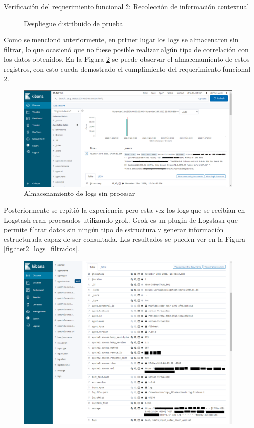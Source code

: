 \begin{section}{Verificación del requerimiento funcional 2: Recolección de información contextual}
\begin{figure}[H]
        \caption{Despliegue distribuido de prueba}
        \label{fig:iter2_despl_dist}
    \end{figure}
    \FloatBarrier
    Como se mencionó anteriormente, en primer lugar los logs se almacenaron sin filtrar, lo que ocasionó que no fuese posible realizar algún tipo de correlación con los datos obtenidos. En la Figura \ref{fig:iter2_logs_crudos} se puede observar el almacenamiento de estos registros, con esto queda demostrado el cumplimiento del requerimiento funcional 2.
    \begin{figure}[H]
    \centering
        \includegraphics[width=1\textwidth]{./iteracion_2_imagenes/1_kibana_logs_1EDITADA.png}
        \caption{Almacenamiento de logs sin procesar}
        \label{fig:iter2_logs_crudos}
    \end{figure}
    \FloatBarrier
    Posteriormente se repitió la experiencia pero esta vez los logs que se recibían en Logstash eran procesados utilizando grok. Grok es un plugin de Logstash que permite filtrar datos sin ningún tipo de estructura y generar información estructurada capaz de ser consultada.
    Los resultados se pueden ver en la Figura \ref{fig:iter2_logs_filtrados}.\par
    \begin{figure}[H]
    \centering
        \includegraphics[width=1\textwidth]{./iteracion_2_imagenes/kibana_logs_parseados_2EDITADO.png}

\end{figure}
\end{section}
